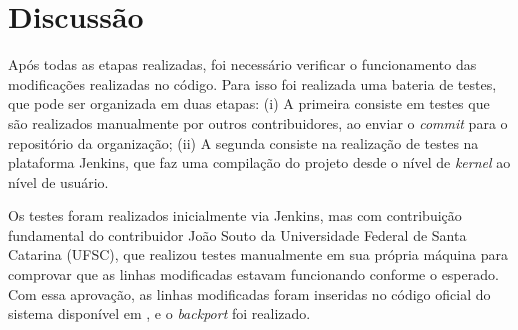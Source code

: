 \section{Discussão}

Após todas as etapas realizadas, foi necessário verificar o funcionamento das modificações realizadas no código. Para isso foi realizada uma bateria de testes, que 
pode ser organizada em duas etapas: (i) A primeira consiste em testes que são realizados manualmente por outros contribuidores, ao enviar o \textit{commit} para o repositório da organização; (ii) A segunda consiste na realização de testes na plataforma Jenkins, que faz uma compilação do projeto desde o nível de \textit{kernel} ao nível de usuário. 

Os testes foram realizados inicialmente via Jenkins, mas com contribuição fundamental do contribuidor João Souto da Universidade Federal de Santa Catarina (UFSC), que realizou testes manualmente em sua própria máquina para comprovar que as linhas modificadas estavam funcionando conforme o esperado. Com essa aprovação, as linhas modificadas foram inseridas no código oficial do sistema disponível em \cite{SolucaoInstrucoesDOWNGrade}, e o \textit{backport} foi realizado. 
